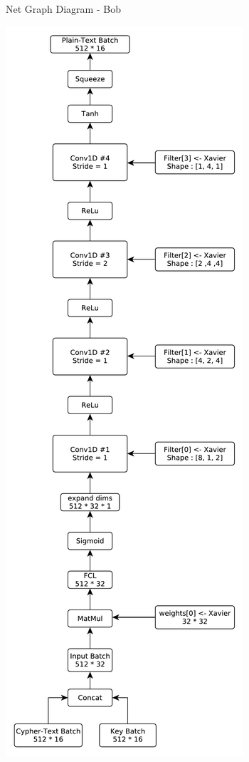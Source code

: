 \documentclass[12pt]{article}
\begin{document}
\newpage
\begin{blockfigure}{ Net Graph Diagram - Bob}
	\begin{center}
		\includegraphics[height=0.93\textheight]{Bob-Diagram}
	\end{center}
\end{blockfigure}
\end{document}
